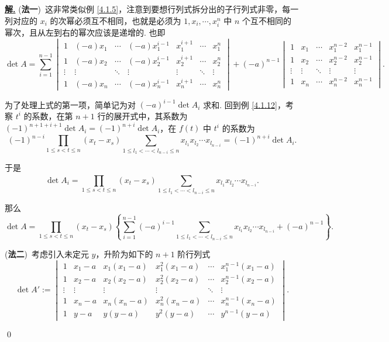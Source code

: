 \documentclass[10pt,openany]{article}
\theoremstyle{thmstyle} %
\theoremstyle{defstyle} %
\theoremstyle{prostyle} %
\theoremstyle{exastyle}
\theoremstyle{remstyle}
\newenvironment{solution}{\par\underline{\textbf{解.}} \;\fangsong}{\qed\par}
\begin{document}
\begin{solution}
	(\textbf{法一})\ 这非常类似例 \ref{4.1.5}，注意到要想行列式拆分出的子行列式非零，每一列对应的 \( x_i \) 的次幂必须互不相同，也就是必须为 \( 1,x_i,\cdots,x_i^n \) 中 \( n \) 个互不相同的幂次，且从左到右的幂次应该是递增的. 也即
	\[ \det A=  \sum_{i=1}^{n-1} \begin{vmatrix}
		1 & (-a)x_1 & \cdots & (-a)x_1^{i-1} & x_1^{i+1} & \cdots & x_1^{n} \\
		1 & (-a)x_2 & \cdots & (-a)x_2^{i-1} & x_2^{i+1} & \cdots & x_2^{n} \\
		\vdots & \vdots & \ddots & \vdots & \vdots & \ddots & \vdots \\
		1 & (-a)x_n & \cdots & (-a)x_n^{i-1} & x_n^{i+1} & \cdots & x_n^{n}
	\end{vmatrix}+ (-a)^{n-1} \begin{vmatrix}
	1 & x_1 & \cdots & x_1^{n-2} & x_1^{n-1} \\
	1 & x_2 & \cdots & x_2^{n-2} & x_2^{n-1} \\
	\vdots & \vdots & \ddots & \vdots & \vdots \\
	1 & x_n & \cdots & x_n^{n-2} & x_n^{n-1}
	\end{vmatrix}. \]
	
	为了处理上式的第一项，简单记为对 \( (-a)^{i-1}\det A_i \) 求和. 回到例 \ref{4.1.12}，考察 \( t^i \) 的系数，在第 \( n+1 \) 行的展开式中，其系数为 \( (-1)^{n+1+i+1} \det A_i=(-1)^{n+i} \det A_i \)，在 \( f(t) \) 中 \( t^i \) 的系数为
	\[ (-1)^{n-i} \prod_{1 \leq s<t \leq n}^{} (x_t-x_s) \sum_{1 \leq l_1<\cdots<l_{n-i} \leq n}^{} x_{l_1}x_{l_2}\cdots x_{l_{n-i}}= (-1)^{n+i} \det A_i. \]
	
	于是
	\[ \det A_i= \prod_{1 \leq s<t \leq n}^{} (x_t-x_s) \sum_{1 \leq l_1<\cdots<l_{n-i} \leq n}^{} x_{l_1}x_{l_2}\cdots x_{l_{n-i}}. \]
	
	那么
	\[ \det A= \prod_{1 \leq s<t \leq n}^{} (x_t-x_s) \left\{ \sum_{i=1}^{n-1} (-a)^{i-1}  \sum_{1 \leq l_1<\cdots<l_{n-i} \leq n}^{} x_{l_1}x_{l_2}\cdots x_{l_{n-i}}+ (-a)^{n-1} \right\}. \]
	
	(\textbf{法二})\ 考虑引入未定元 \( y \)，升阶为如下的 \( n+1 \) 阶行列式
	\[ \det A':= \begin{vmatrix}
		1 & x_1-a & x_1(x_1-a) & x_1^{2}(x_1-a) & \cdots & x_1^{n-1}(x_1-a) \\
		1 & x_2-a & x_2(x_2-a) & x_2^{2}(x_2-a) & \cdots & x_2^{n-1}(x_2-a) \\
		\vdots & \vdots & \vdots & \vdots & \ddots & \vdots \\
		1 & x_n-a & x_n(x_n-a) & x_n^{2}(x_n-a) & \cdots & x_n^{n-1}(x_n-a) \\
		1 & y-a & y(y-a) & y^2(y-a) & \cdots & y^{n-1}(y-a)
	\end{vmatrix}. \]
	

\end{solution}
\end{document}
